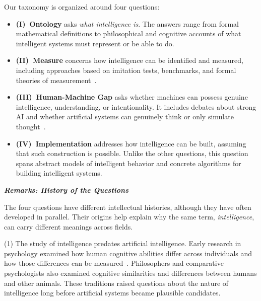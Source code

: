 \documentclass[acmsmall,screen,review,anonymous]{acmart}
\begin{document}
Our taxonomy is organized around four questions:
\begin{itemize}
\item \textbf{(I)~Ontology} asks \textit{what intelligence is}.
%
The answers range from formal mathematical definitions to philosophical and cognitive accounts of what intelligent systems must represent or be able to do.
\item \textbf{(II)~Measure} concerns how intelligence can be identified and measured, including approaches based on imitation tests, benchmarks, and formal theories of measurement~\citep{turing1950, hernandezorallo2017, chollet2019measureintelligence}. 
\item \textbf{(III)~Human-Machine Gap} asks whether machines can possess genuine intelligence, understanding, or intentionality.
%
It includes debates about strong AI and whether artificial systems can genuinely think or only simulate thought~\citep{searle1980, dreyfus1972}. 
\item \textbf{(IV)~Implementation} addresses how intelligence can be built, assuming that such construction is possible.
%
Unlike the other questions, this question spans abstract models of intelligent behavior and concrete algorithms for building intelligent systems.
\end{itemize}


\vspace{2mm}
\noindent \textbf{\textit{Remarks: History of the Questions}}

The four questions have different intellectual histories, although they have often developed in parallel.
%
Their origins help explain why the same term, \textit{intelligence}, can carry different meanings across fields.

(1) The study of intelligence predates artificial intelligence.
%
Early research in psychology examined how human cognitive abilities differ across individuals and how those differences can be measured~\citep{thorndike1926measurement, spearman1904}.
%
Philosophers and comparative psychologists also examined cognitive similarities and differences between humans and other animals.
%
These traditions raised questions about the nature of intelligence long before artificial systems became plausible candidates.
\end{document}
